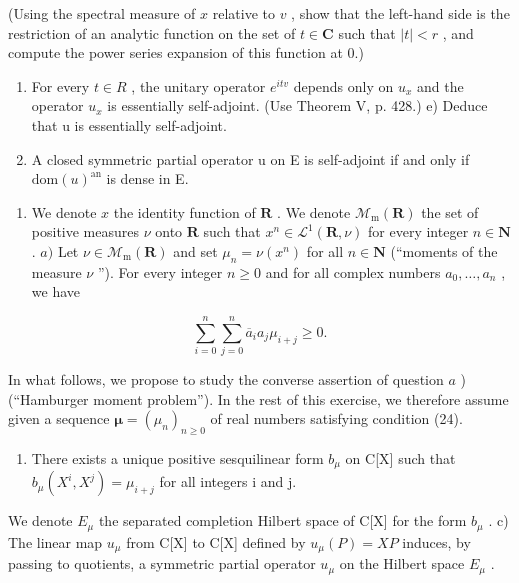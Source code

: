 (Using the spectral measure of \(x\) relative to \(v\) , show that the left-hand side is the restriction of an analytic function on the set of \(t \in \mathbf{C}\) such that \(|t| < r\) , and compute the power series expansion of this function at 0.)

\begin{enumerate}
\def\labelenumi{\alph{enumi})}
\setcounter{enumi}{3}
\item
  For every \(t \in R\) , the unitary operator \(e^{itv}\) depends only on \(u_x\) and the operator \(u_x\) is essentially self-adjoint. (Use Theorem V, p. 428.) e) Deduce that u is essentially self-adjoint.
\item
  A closed symmetric partial operator u on E is self-adjoint if and only if \(\text{dom}(u)^{\text{an}}\) is dense in E.
\end{enumerate}

\begin{enumerate}
\def\labelenumi{\arabic{enumi})}
\setcounter{enumi}{20}
\tightlist
\item
  We denote \(x\) the identity function of \(\mathbf{R}\) . We denote \(\mathcal{M}_{\mathrm{m}}(\mathbf{R})\) the set of positive measures \(\nu\) onto \(\mathbf{R}\) such that \(x^n \in \mathcal{L}^1(\mathbf{R}, \nu)\) for every integer \(n \in \mathbf{N}\) . \(a)\) Let \(\nu \in \mathcal{M}_{\mathrm{m}}(\mathbf{R})\) and set \(\mu_n = \nu(x^n)\) for all \(n \in \mathbf{N}\) (“moments of the measure \(\nu\) ”). For every integer \(n \geqslant 0\) and for all complex numbers \(a_0, \ldots, a_n\) , we have
\end{enumerate}

\[
\sum_ {i = 0} ^ {n} \sum_ {j = 0} ^ {n} \overline {{a}} _ {i} a _ {j} \mu_ {i + j} \geqslant 0.\tag{24}
\]

In what follows, we propose to study the converse assertion of question \(a\) ) (“Hamburger moment problem”). In the rest of this exercise, we therefore assume given a sequence \(\boldsymbol{\mu} = (\mu_n)_{n \geqslant 0}\) of real numbers satisfying condition (24).

\begin{enumerate}
\def\labelenumi{\alph{enumi})}
\setcounter{enumi}{1}
\tightlist
\item
  There exists a unique positive sesquilinear form \(b_{\mu}\) on C{[}X{]} such that \(b_{\mu}(X^{i}, X^{j}) = \mu_{i+j}\) for all integers i and j.
\end{enumerate}

We denote \(E_{\mu}\) the separated completion Hilbert space of C{[}X{]} for the form \(b_{\mu}\) . c) The linear map \(u_{\mu}\) from C{[}X{]} to C{[}X{]} defined by \(u_{\mu}(P) = XP\) induces, by passing to quotients, a symmetric partial operator \(u_{\mu}\) on the Hilbert space \(E_{\mu}\) .

